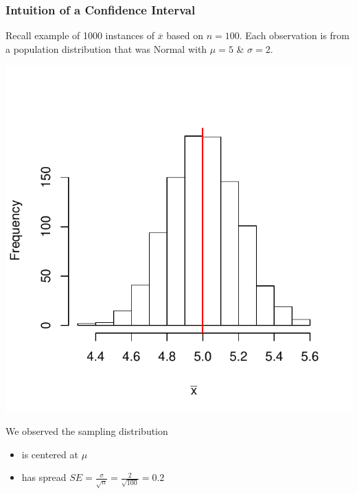 \documentclass[handout]{beamer}
\newcommand{\xbar}{\overline{x}}
\begin{document}
\begin{frame}[fragile]
\frametitle{Intuition of a Confidence Interval}
Recall example of 1000 instances of $\xbar$ based on $n=100$.  Each observation is from a population distribution that was Normal with $\mu=5$ \& $\sigma=2$.  

\pause {}
\begin{center}
\includegraphics{figure/lec12-001}
\end{center}

\pause We observed the sampling distribution
\begin{itemize}
\item is centered at $\mu$
\item has spread $SE = \frac{\sigma}{\sqrt n} = \frac{2}{\sqrt{100}} = 0.2$
\end{itemize}

\end{frame}
\end{document}
